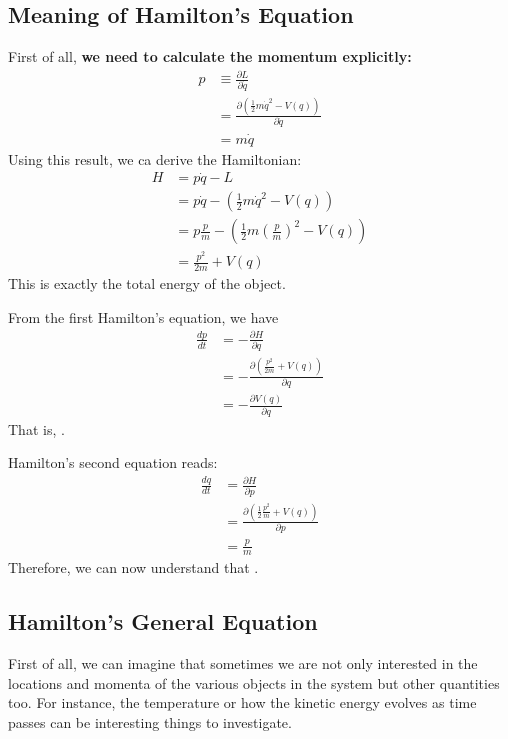 \subsection{Meaning of Hamilton's Equation}
First of all, \textbf{we need to calculate the momentum explicitly:}
$$
\begin{aligned}
p & \equiv \frac{\partial L}{\partial \dot{q}} \\
&=\frac{\partial\left(\frac{1}{2} m \dot{q}^{2}-V(q)\right)}{\partial \dot{q}} \\
&=m \dot{q}
\end{aligned}
$$
Using this result, we ca derive the Hamiltonian:
$$
\begin{aligned}
H &=p \dot{q}-L \\
&=p \dot{q}-\left(\frac{1}{2} m \dot{q}^{2}-V(q)\right) \\
&=p \frac{p}{m}-\left(\frac{1}{2} m\left(\frac{p}{m}\right)^{2}-V(q)\right) \\
&=\frac{p^{2}}{2 m}+V(q)
\end{aligned}
$$
This is exactly the total energy of the object.

From the first Hamilton's equation, we have
$$
\begin{aligned}
\frac{d p}{d t} &=-\frac{\partial H}{\partial q} \\
&=-\frac{\partial\left(\frac{p^{2}}{2 m}+V(q)\right)}{\partial q} \\
&=-\frac{\partial V(q)}{\partial q}
\end{aligned}
$$
That is, .

Hamilton's second equation reads:
$$
\begin{aligned}
\frac{d q}{d t} &=\frac{\partial H}{\partial p} \\
&=\frac{\partial\left(\frac{1}{2} \frac{p^{2}}{m}+V(q)\right)}{\partial p} \\
&=\frac{p}{m}
\end{aligned}
$$
Therefore, we can now understand that .

\subsection{Hamilton's General Equation}
First of all, we can imagine that sometimes we are not only interested in the locations and momenta of the various objects in
the system but other quantities too. For instance, the temperature or how the kinetic energy evolves as time passes can be interesting things to investigate. 

